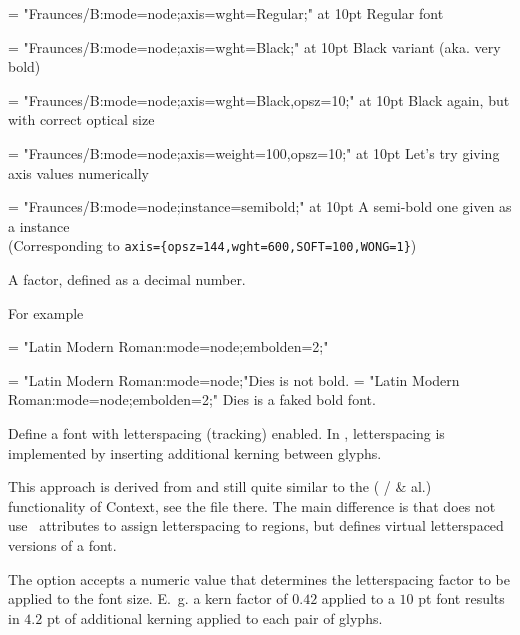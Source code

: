       {\def\fraunces#1#2{%
         \font\varfont = "Fraunces/B:mode=node;#1;" at #2pt\varfont
       }
       \fraunces{axis={wght=Regular}}{10}Regular font\par
       \fraunces{axis={wght=Black}}{10}Black variant (aka. very bold)\par
       \fraunces{axis={wght=Black,opsz=10}}{10}Black again, but with
       correct optical size\par
       \fraunces{axis={weight=100,opsz=10}}{10}Let's try giving axis values
       numerically\par
       \fraunces{instance=semibold}{10}A semi-bold one given as a
       instance\\
       (Corresponding to
       \verb|axis={opsz=144,wght=600,SOFT=100,WONG=1}|)\par
      }

  \endaltitem

         A factor, defined as a decimal number.

         For example

         \beginlisting
      \font\test = "Latin Modern Roman:mode=node;embolden=2;"
         \endlisting

      {\font\test= "Latin Modern Roman:mode=node;"\test Dies is not bold.
       \font\test= "Latin Modern Roman:mode=node;embolden=2;" \test Dies is a faked bold font.}

  \endaltitem

  \label{p:letterspace}
         Define a font with letterspacing (tracking) enabled.
         In , letterspacing is implemented by
         inserting additional kerning between glyphs.

         This approach is derived from and still quite similar to the
          ( /
          \& al.) functionality of
         Context, see the file  there.
         The main difference is that  does not
         use \LuaTeX\ attributes to assign letterspacing to regions,
         but defines virtual letterspaced versions of a font.

         The option  accepts a numeric value that
         determines the letterspacing factor to be applied to the font
         size.
         E.~g. a kern factor of $0.42$ applied to a $10$ pt font
         results in $4.2$ pt of additional kerning applied to each
         pair of glyphs.


